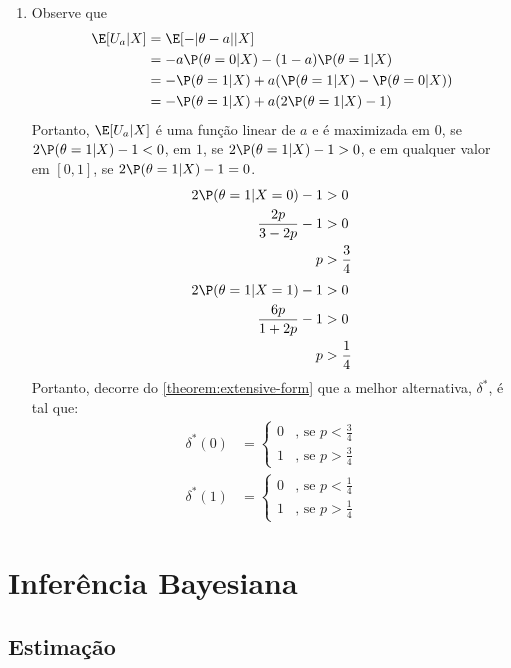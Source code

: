 {\begin{enumerate}[label=(\alph*)]
  \item Observe que
  \begin{align*}
   \E[U_{a}|X]
   &= \E[-|\theta-a||X] \\
   &= -a\P(\theta=0|X) -(1-a)\P(\theta=1|X) \\
   &= -\P(\theta=1|X)
   +a(\P(\theta=1|X)-\P(\theta=0|X)) \\
   &= -\P(\theta=1|X) +a(2\P(\theta=1|X)-1)
  \end{align*}
  Portanto, $\E[U_{a}|X]$ é uma função linear de $a$ e
  é maximizada em $0$, se $2\P(\theta=1|X)-1 < 0$,
  em $1$, se $2\P(\theta=1|X)-1 > 0$, e
  em qualquer valor em $[0,1]$, se 
  $2\P(\theta=1|X)-1=0$.
  \begin{align*}
   2\P(\theta=1|X=0)-1 &> 0 \\
   \frac{2p}{3-2p}-1 &> 0 \\
   p &> \frac{3}{4}
  \end{align*}
  \begin{align*}
   2\P(\theta=1|X=1)-1 &> 0 \\
   \frac{6p}{1+2p}-1 &> 0 \\
   p &> \frac{1}{4}
  \end{align*}
  Portanto, decorre do \cref{theorem:extensive-form} que
  a melhor alternativa, $\delta^{*}$, é tal que:
  \begin{align*}
   \delta^{*}(0) &=
   \begin{cases}
    0 & \text{, se $p < \frac{3}{4}$} \\
    1 & \text{, se $p > \frac{3}{4}$}
   \end{cases}
  \end{align*}
  \begin{align*}
   \delta^{*}(1) &=
   \begin{cases}
    0 & \text{, se $p < \frac{1}{4}$} \\
    1 & \text{, se $p > \frac{1}{4}$}
   \end{cases}
  \end{align*}
 \end{enumerate}
}{}

 

\section{Inferência Bayesiana}
\subsection{Estimação}

